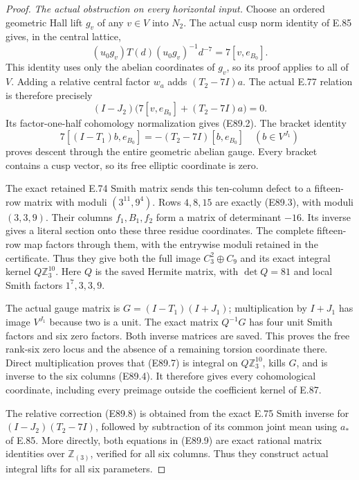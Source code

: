 \begin{proof}
\emph{The actual obstruction on every horizontal input.}
Choose an ordered geometric Hall lift $g_v$ of
any $v\in V$ into $N_2$. The actual cusp norm
identity of E.85 gives, in the central lattice,
\[
  (u_0g_v)T(d)(u_0g_v)^{-1}d^{-7}=7[v,e_{B_0}].
 \tag{E89.14}
\]
This identity uses only the abelian coordinates
of $g_v$, so its proof applies to all of $V$.
Adding a relative central factor $w_a$ adds
$(T_2-7I)a$. The actual E.77 relation is
therefore precisely
\[
 (I-J_2)\bigl(7[v,e_{B_0}]+(T_2-7I)a\bigr)=0.
 \tag{E89.15}
\]
Its factor-one-half cohomology normalization
gives (E89.2). The bracket identity
\[
 7[(I-T_1)b,e_{B_0}]
       =-(T_2-7I)[b,e_{B_0}]
                   \quad(b\in V^{J_1})
 \tag{E89.16}
\]
proves descent through the entire geometric
abelian gauge. Every bracket contains a cusp
vector, so its free elliptic coordinate is zero.

The exact retained E.74 Smith matrix sends this
ten-column defect to a fifteen-row matrix with
moduli $(3^{11},9^4)$. Rows $4,8,15$ are exactly
(E89.3), with moduli $(3,3,9)$. Their columns
$f_1,B_1,f_2$ form a matrix of determinant $-16$.
Its inverse gives a literal section onto these
three residue coordinates. The complete
fifteen-row map factors through them, with the
entrywise moduli retained in the certificate.
Thus they give both the full image $C_3^2\oplus C_9$
and its exact integral kernel $Q\mathbb Z_3^{10}$.
Here $Q$ is the saved Hermite matrix, with
$\det Q=81$ and local Smith factors
$1^7,3,3,9$.

The actual gauge matrix is
$G=(I-T_1)(I+J_1)$; multiplication by $I+J_1$
has image $V^{J_1}$ because two is a unit.
The exact matrix $Q^{-1}G$ has four unit
Smith factors and six zero factors. Both
inverse matrices are saved. This proves the
free rank-six zero locus and the absence
of a remaining torsion coordinate there.
Direct multiplication proves that (E89.7)
is integral on $Q\mathbb Z_3^{10}$, kills $G$,
and is inverse to the six columns (E89.4).
It therefore gives every cohomological
coordinate, including every preimage outside
the coefficient kernel of E.87.

The relative correction (E89.8) is obtained
from the exact E.75 Smith inverse for
$(I-J_2)(T_2-7I)$, followed by subtraction
of its common joint mean using $a_*$ of
E.85. More directly, both equations in
(E89.9) are exact rational matrix identities
over $\mathbb Z_{(3)}$, verified for all
six columns. Thus they construct actual
integral lifts for all six parameters.


\end{proof}
